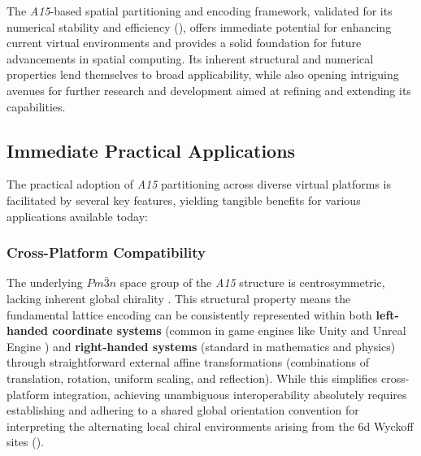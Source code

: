 \documentclass[10pt]{article}
\def\AAAB{\textit{A15}}
\begin{document}
The \AAAB{}-based spatial partitioning and encoding framework, validated for its numerical stability and efficiency (), offers immediate potential for enhancing current virtual environments and provides a solid foundation for future advancements in spatial computing. Its inherent structural and numerical properties lend themselves to broad applicability, while also opening intriguing avenues for further research and development aimed at refining and extending its capabilities.

\subsection{Immediate Practical Applications}\label{subsec:applications}

The practical adoption of \AAAB{} partitioning across diverse virtual platforms is facilitated by several key features, yielding tangible benefits for various applications available today:

\subsubsection{Cross-Platform Compatibility}\label{subsubsec:apps-coordsys}
The underlying $Pm\bar{3}n$ space group of the \AAAB{} structure is centrosymmetric, lacking inherent global chirality \cite{ITCVolumeA2016}. This structural property means the fundamental lattice encoding can be consistently represented within both \textbf{left-handed coordinate systems} (common in game engines like Unity \cite{UnityCoords} and Unreal Engine \cite{UnrealCoords}) and \textbf{right-handed systems} (standard in mathematics and physics) through straightforward external affine transformations (combinations of translation, rotation, uniform scaling, and reflection). While this simplifies cross-platform integration, achieving unambiguous interoperability absolutely requires establishing and adhering to a shared global orientation convention for interpreting the alternating local chiral environments arising from the 6d Wyckoff sites ().
\end{document}
